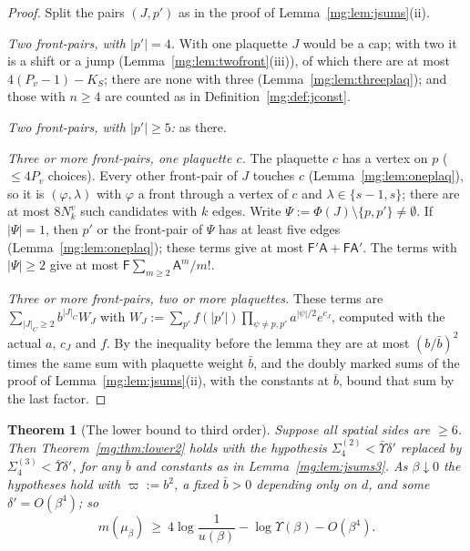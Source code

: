 \documentclass[11pt,a4paper]{article}
\newtheorem{theorem}{Theorem}[section]
\theoremstyle{definition}
\theoremstyle{remark}
\begin{document}
\begin{proof}
Split the pairs $(J,p')$ as in the proof of Lemma~\ref{mg:lem:jsums}(ii).

\emph{Two front-pairs, with $|p'|=4$.} With one plaquette $J$ would be a cap; with two it is a shift or a jump (Lemma~\ref{mg:lem:twofront}(iii)), of which
there are at most $4(P_v-1)-K_S$; there are none with three (Lemma~\ref{mg:lem:threeplaq}); and those with $n\ge4$ are counted as in
Definition~\ref{mg:def:jconst}.

\emph{Two front-pairs, with $|p'|\ge5$:} as there.

\emph{Three or more front-pairs, one plaquette $c$.} The plaquette $c$ has a vertex on $p$ ($\le4P_v$ choices). Every other front-pair of $J$ touches $c$
(Lemma~\ref{mg:lem:oneplaq}), so it is $(\varphi,\lambda)$ with $\varphi$ a front through a vertex of $c$ and $\lambda\in\{s-1,s\}$; there are at most $8N^v_k$ such
candidates with $k$ edges. Write $\Psi:=\Phi(J)\setminus\{p,p'\}\ne\emptyset$. If $|\Psi|=1$, then $p'$ or the front-pair of $\Psi$ has at least five edges
(Lemma~\ref{mg:lem:oneplaq}); these terms give at most $\mathsf F'\mathsf A+\mathsf F\mathsf A'$. The terms with $|\Psi|\ge2$ give at most $\mathsf F\sum_{m\ge2}\mathsf A^m/m!$.

\emph{Three or more front-pairs, two or more plaquettes.} These terms are $\sum_{|J|_C\ge2}b^{|J|_C}W_J$ with
$W_J:=\sum_{p'}f(|p'|)\prod_{\psi\ne p,p'}a^{|\psi|/2}e^{c_J}$, computed with the actual $a$, $c_J$ and $f$. By the inequality before the lemma they are at most
$(b/\bar b)^2$ times the same sum with plaquette weight $\bar b$, and the doubly marked sums of the proof of Lemma~\ref{mg:lem:jsums}(ii), with the
constants at $\bar b$, bound that sum by the last factor.
\end{proof}

\begin{theorem}[The lower bound to third order]\label{mg:thm:lower3}
Suppose all spatial sides are $\ge6$. Then Theorem~\ref{mg:thm:lower2} holds with the hypothesis $\Sigma^{(2)}_4<\bar\Upsilon\delta'$ replaced by
$\Sigma^{(3)}_4<\bar\Upsilon\delta'$, for any $\bar b$ and constants as in Lemma~\ref{mg:lem:jsums3}. As $\beta\downarrow0$ the hypotheses hold with
$\varpi:=b^2$, a fixed $\bar b>0$ depending only on $d$, and some $\delta'=O(\beta^4)$; so
\[
m(\mu_\beta)\ \ge\ 4\log\frac1{u(\beta)}-\log\Upsilon(\beta)-O(\beta^4).
\]
\end{theorem}
\end{document}
